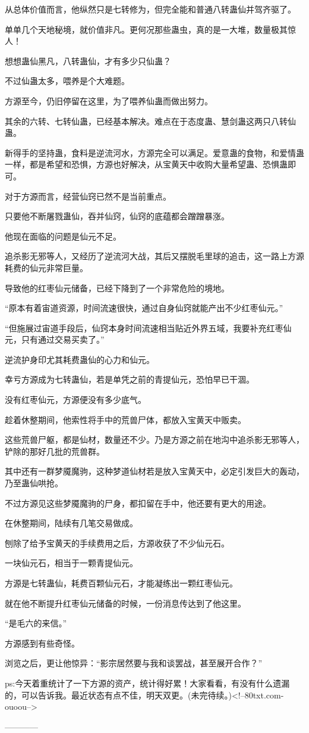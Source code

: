 \begin{this_body}
从总体价值而言，他纵然只是七转修为，但完全能和普通八转蛊仙并驾齐驱了。

单单几个天地秘境，就价值非凡。更何况那些蛊虫，真的是一大堆，数量极其惊人！

想想蛊仙黑凡，八转蛊仙，才有多少只仙蛊？

不过仙蛊太多，喂养是个大难题。

方源至今，仍旧停留在这里，为了喂养仙蛊而做出努力。

其余的六转、七转仙蛊，已经基本解决。难点在于态度蛊、慧剑蛊这两只八转仙蛊。

新得手的坚持蛊，食料是逆流河水，方源完全可以满足。爱意蛊的食物，和爱情蛊一样，都是希望和恐惧，方源也好解决，从宝黄天中收购大量希望蛊、恐惧蛊即可。

对于方源而言，经营仙窍已然不是当前重点。

只要他不断屠戮蛊仙，吞并仙窍，仙窍的底蕴都会蹭蹭暴涨。

他现在面临的问题是仙元不足。

追杀影无邪等人，又经历了逆流河大战，其后又摆脱毛里球的追击，这一路上方源耗费的仙元非常巨量。

导致他的红枣仙元储备，已经下降到了一个非常危险的境地。

“原本有着宙道资源，时间流速很快，通过自身仙窍就能产出不少红枣仙元。”

“但施展过宙道手段后，仙窍本身时间流速相当贴近外界五域，我要补充红枣仙元，只有通过交易买卖了。”

逆流护身印尤其耗费蛊仙的心力和仙元。

幸亏方源成为七转蛊仙，若是单凭之前的青提仙元，恐怕早已干涸。

没有红枣仙元，方源便没有多少底气。

趁着休整期间，他索性将手中的荒兽尸体，都放入宝黄天中贩卖。

这些荒兽尸躯，都是仙材，数量还不少。乃是方源之前在地沟中追杀影无邪等人，铲除的那好几批的荒兽群。

其中还有一群梦魇魔驹，这种梦道仙材若是放入宝黄天中，必定引发巨大的轰动，乃至蛊仙哄抢。

不过方源见这些梦魇魔驹的尸身，都扣留在手中，他还要有更大的用途。

在休整期间，陆续有几笔交易做成。

刨除了给予宝黄天的手续费用之后，方源收获了不少仙元石。

一块仙元石，相当于一颗青提仙元。

方源是七转蛊仙，耗费百颗仙元石，才能凝练出一颗红枣仙元。

就在他不断提升红枣仙元储备的时候，一份消息传达到了他这里。

“是毛六的来信。”

方源感到有些奇怪。

浏览之后，更让他惊异：“影宗居然要与我和谈罢战，甚至展开合作？”

ps:今天着重统计了一下方源的资产，统计得好累！大家看看，有没有什么遗漏的，可以告诉我。最近状态有点不佳，明天双更。(未完待续。)<!--80txt.com-ouoou-->

------------

\end{this_body}

